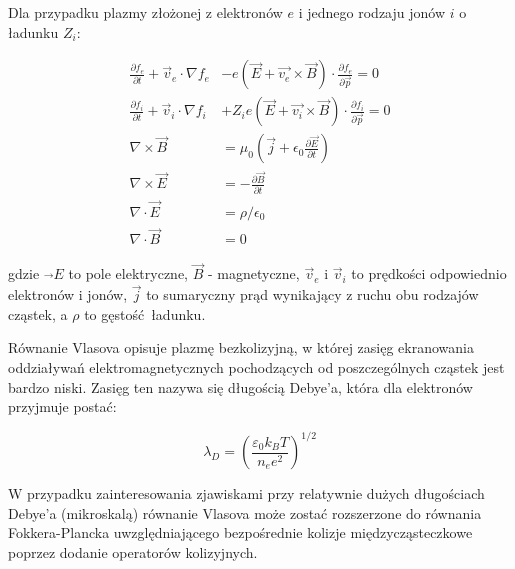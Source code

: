     Dla przypadku plazmy złożonej z elektronów $e$ i jednego rodzaju jonów $i$ o ładunku $Z_i$:

    \begin{align}
    \frac{\partial f_e}{\partial t} + \vec {v}_e\cdot\nabla f_e &- e\left(\vec {E}+\vec {v_e}\times\vec {B}\right)\cdot\frac{\partial f_e}{\partial\vec {p}} = 0
    \label{eqn:vlasov-electrons}\\
    \frac{\partial f_i}{\partial t} + \vec {v}_i\cdot\nabla f_i &+ Z_i e\left(\vec {E}+\vec {v_i}\times\vec {B}\right)\cdot\frac{\partial f_i}{\partial\vec {p}} = 0
    \label{eqn:vlasov-ions}\\
    \nabla \times \vec{B} &=\mu_0 \left(\vec{j}+\epsilon_0 \frac{\partial \vec{E} }{\partial t}\right)
    \label{eqn:maxwell-B-rotation}\\
    \nabla\times\vec {E} &=-\frac{\partial\vec {B}}{\partial t}
    \label{eqn:maxwell-E-rotation}\\
    \nabla\cdot\vec {E}  &=\rho / \epsilon_0
    \label{eqn:maxwell-E-div}\\
    \nabla\cdot\vec {B}  &=0
    \label{eqn:maxwell-B-div}
    \end{align}

    gdzie $\vec{}E$ to pole elektryczne, $\vec{B}$ - magnetyczne, $\vec{v}_e$ i $\vec{v}_i$ to
    prędkości odpowiednio elektronów i jonów, $\vec{j}$ to sumaryczny prąd wynikający z ruchu
    obu rodzajów cząstek, a $\rho$ to gęstość ładunku.

    Równanie Vlasova opisuje plazmę bezkolizyjną, w której zasięg ekranowania
    oddziaływań elektromagnetycznych pochodzących od poszczególnych cząstek
    jest bardzo niski. Zasięg ten nazywa się długością Debye'a, która dla
    elektronów przyjmuje postać:

    \begin{equation}
    \lambda_D = {\left( \frac{\varepsilon_0 k_B T}{n_e e^2} \right)}^{1/2}
    \label{eqn:debye-length}
    \end{equation}

    W przypadku zainteresowania zjawiskami przy relatywnie dużych długościach
    Debye'a (mikroskalą) równanie Vlasova może zostać rozszerzone do równania Fokkera-Plancka
    uwzględniającego bezpośrednie kolizje międzycząsteczkowe poprzez dodanie operatorów kolizyjnych.

